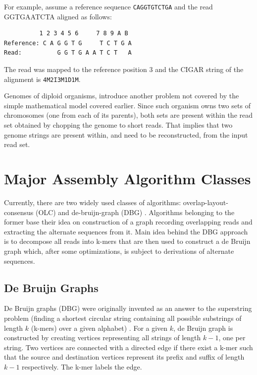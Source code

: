 For example, assume a reference sequence \texttt{CAGGTGTCTGA} and the read GGTGAATCTA aligned as follows: 
\begin{verbatim} 
          1 2 3 4 5 6     7 8 9 A B 
Reference: C A G G T G     T C T G A 
Read:          G G T G A A T C T   A 
\end{verbatim} 
The read was mapped to the reference position 3 and the CIGAR string of the alignment is \texttt{4M2I3M1D1M}. 

Genomes of diploid organisms, introduce another problem not covered by the simple mathematical model covered earlier. Since such organism owns two sets of chromosomes (one from each of its parents), both sets are present within the read set obtained by chopping the genome to short reads. That implies that two genome strings are present within, and need to be reconstructed, from the input read set. 

\section{Major Assembly Algorithm Classes} 
\label{sec:major-assembly-algorithm-classes} 

Currently, there are two widely used classes of algorithms: overlap-layout-consensus (OLC) and de-bruijn-graph (DBG) \cite{alg-compare}. Algorithms belonging to the former base their idea on construction of a graph recording overlapping reads and extracting the alternate sequences from it. Main idea behind the DBG approach is to decompose all reads into k-mers that are then used to construct a de Bruijn graph which, after some optimizations, is subject to derivations of alternate sequences. 

\subsection{De Bruijn Graphs} 
\label{subsec:de-bruijn-graphs} 

De Bruijn graphs (DBG) were originally invented as an answer to the superstring problem  (finding a shortest circular string containing all possible substrings of length $k$ (k-mers) over a given alphabet) \cite{dbg-apply}. For a given $k$, de Bruijn graph is constructed by creating vertices representing all strings of length $k-1$, one per string. Two vertices are connected with a directed edge if there exist a k-mer such that the source and destination vertices represent its prefix and suffix of length $k-1$ respectively. The k-mer labels the edge.  

